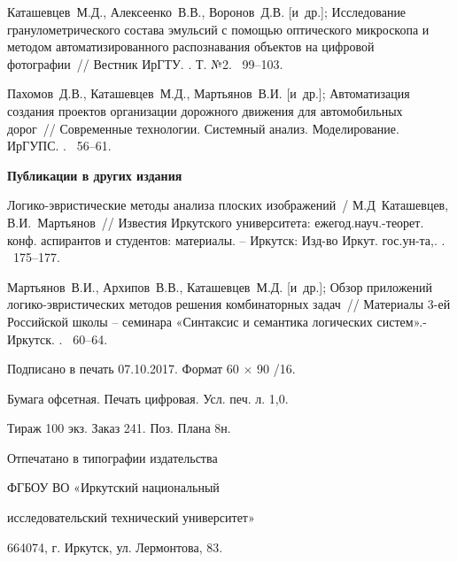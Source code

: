 \begin{thebibliography}{10}
Каташевцев~М.Д., Алексеенко~В.В., Воронов~Д.В.
  {[и~др.]}; Исследование гранулометрического
  состава эмульсий с помощью оптического
  микроскопа и методом автоматизированного
  распознавания объектов на цифровой
  фотографии~// Вестник ИрГТУ.
.
\newblock Т. №2.
~99--103.{}

Пахомов~Д.В., Каташевцев~М.Д., Мартьянов~В.И.
  {[и~др.]}; Автоматизация создания проектов
  организации дорожного движения для
  автомобильных дорог~// Современные
  технологии. Системный анализ.
  Моделирование. ИрГУПС.
.
~56--61.{}

\centerline{\textbf{Публикации в других издания}}

Логико-эвристические методы анализа
  плоских изображений~/ М.Д~Каташевцев,
  В.И.~Мартьянов~// Известия Иркутского
  университета: ежегод.науч.-теорет. конф.
  аспирантов и студентов: материалы. –
  Иркутск: Изд-во Иркут. гос.ун-та,.
.
~175--177.{}

Мартьянов~В.И., Архипов~В.В., Каташевцев~М.Д.
  {[и~др.]}; Обзор приложений
  логико-эвристических методов решения
  комбинаторных задач~// Материалы 3-ей
  Российской школы – семинара «Синтаксис и
  семантика логических систем».- Иркутск.
.
~60--64.{}

\end{thebibliography}


\vfill
{}
\begin{center}
Подписано в печать 07.10.2017. Формат 60 $\times$ 90 /16.

Бумага офсетная. Печать цифровая. Усл. печ. л. 1,0.

Тираж 100 экз. Заказ 241. Поз. Плана 8н.
\bigskip

Отпечатано в типографии издательства

ФГБОУ ВО «Иркутский национальный 

исследовательский технический университет»

664074, г. Иркутск, ул. Лермонтова, 83.
\end{center}
